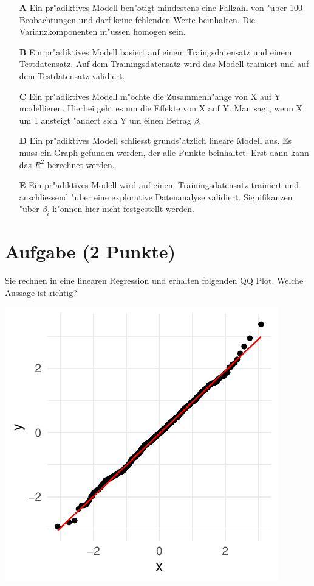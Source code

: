 \documentclass[a4paper, 9pt]{scrartcl}\usepackage[]{graphicx}\usepackage[]{xcolor}
\makeatletter
\def\maxwidth{ %
  \ifdim\Gin@nat@width>\linewidth
    \linewidth
  \else
    \Gin@nat@width
  \fi
}
\makeatother
\begin{document}
\begin{enumerate}
\item [\textbf{A} \msquare] Ein pr{"a}diktives Modell ben{"o}tigt mindestens eine Fallzahl von {"u}ber 100 Beobachtungen und darf keine fehlenden Werte beinhalten. Die Varianzkomponenten m{"u}ssen homogen sein.
\item [\textbf{B} \msquare] Ein pr{"a}diktives Modell basiert auf einem Traingsdatensatz und einem Testdatensatz. Auf dem Trainingsdatensatz wird das Modell trainiert und auf dem Testdatensatz validiert.
\item [\textbf{C} \msquare] Ein pr{"a}diktives Modell m{"o}chte die Zusammenh{"a}nge von X auf Y modellieren. Hierbei geht es um die Effekte von X auf Y. Man sagt, wenn X um 1 ansteigt {"a}ndert sich Y um einen Betrag $\beta$.
\item [\textbf{D} \msquare] Ein pr{"a}diktives Modell schliesst grunds{"a}tzlich lineare Modell aus. Es muss ein Graph gefunden werden, der alle Punkte beinhaltet. Erst dann kann das $R^2$ berechnet werden.
\item [\textbf{E} \msquare] Ein pr{"a}diktives Modell wird auf einem Trainingsdatensatz trainiert und anschliessend {"u}ber eine explorative Datenanalyse validiert. Signifikanzen {"u}ber $\beta_i$ k{"o}nnen hier nicht festgestellt werden.
\end{enumerate} 

\section{Aufgabe \hfill (2 Punkte)}

Sie rechnen in eine linearen Regression und erhalten folgenden QQ
Plot. Welche Aussage ist richtig?




{\centering \includegraphics[width=\maxwidth]{img/mc-regression-05-a-1} 

}
\end{document}
